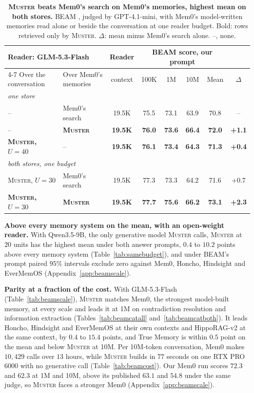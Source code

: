 \documentclass{article}
\newcommand{\ours}{\rowcolor{oursbg}}
\newcommand{\tabfont}{\fontsize{7.5}{8.5}\selectfont\renewcommand{\arraystretch}{1.0}}
\newcommand{\sys}{\textsc{Muster}}
\begin{document}
\begin{table}[!t]
\centering\tabfont
\caption{\textbf{\sys{} beats Mem0's search on Mem0's memories, highest mean on both stores.} BEAM \cite{beam}, judged by GPT-4.1-mini, with Mem0's model-written memories \cite{mem0oss} read alone or beside the conversation at one reader budget. Bold: rows retrieved only by \sys{}. $\Delta$: mean minus Mem0's search alone. --, none.}
\label{tab:extend}
\setlength{\tabcolsep}{3pt}
\begin{tabular}{llcccccc}
\toprule
\multicolumn{2}{l}{\textbf{Reader: GLM-5.3-Flash}~\cite{glm5}} & Reader & \multicolumn{4}{c}{BEAM score, our prompt} & \\
\cmidrule(lr){4-7}
Over the conversation & Over Mem0's memories \cite{mem0oss} & context & 100K & 1M & 10M & Mean & $\Delta$ \\
\midrule
\multicolumn{8}{l}{\emph{one store}}\\
-- & Mem0's search & 19.5K & 75.5 & 73.1 & 63.9 & 70.8 & -- \\
\ours -- & \textbf{\sys{}} & \textbf{19.5K} & \textbf{76.0} & \textbf{73.6} & \textbf{66.4} & \textbf{72.0} & \textbf{+1.1} \\
\ours \textbf{\sys{}, $U{=}40$} & -- & \textbf{19.5K} & \textbf{76.1} & \textbf{73.4} & \textbf{64.3} & \textbf{71.3} & \textbf{+0.4} \\
\midrule
\multicolumn{8}{l}{\emph{both stores, one budget}}\\
\sys{}, $U{=}30$ & Mem0's search & 19.5K & 77.3 & 73.3 & 64.2 & 71.6 & +0.7 \\
\ours \textbf{\sys{}, $U{=}30$} & \textbf{\sys{}} & \textbf{19.5K} & \textbf{77.7} & \textbf{75.6} & \textbf{66.2} & \textbf{73.1} & \textbf{+2.3} \\
\bottomrule
\end{tabular}
\end{table}



\textbf{Above every memory system on the mean, with an open-weight reader.} With Qwen3.5-9B, the only generative model \sys{} calls, \sys{} at $20$ units has the highest mean under both answer prompts, $0.4$ to $10.2$ points above every memory system (Table~\ref{tab:samebudget}), and under BEAM's prompt paired $95\%$ intervals exclude zero against Mem0, Honcho, Hindsight and EverMemOS (Appendix~\ref{app:beamscale}).

\textbf{Parity at a fraction of the cost.} With GLM-5.3-Flash (Table~\ref{tab:beamscale}), \sys{} matches Mem0, the strongest model-built memory, at every scale and leads it at 1M on contradiction resolution and information extraction (Tables~\ref{tab:beamcatall} and~\ref{tab:beamcatboth}). It leads Honcho, Hindsight and EverMemOS at their own contexts and HippoRAG-v2 at the same context, by $0.4$ to $15.4$ points, and True Memory is within $0.5$ point on the mean and below \sys{} at 10M. Per 10M-token conversation, Mem0 makes $10{,}429$ calls over $13$ hours, while \sys{} builds in $77$ seconds on one RTX PRO 6000 with no generative call (Table~\ref{tab:beamcost}). Our Mem0 run scores $72.3$ and $62.3$ at 1M and 10M, above its published $63.1$ and $54.8$ under the same judge, so \sys{} faces a stronger Mem0 (Appendix~\ref{app:beamscale}).
\end{document}
